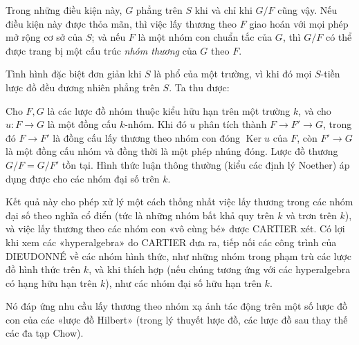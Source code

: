  Trong những điều kiện này, $G$ phẳng trên $S$ khi và chỉ
khi $G/F$ cũng vậy. Nếu điều kiện này được thỏa mãn, thì việc lấy thương
theo $F$ giao hoán với mọi phép mở rộng cơ sở của $S$; và nếu $F$ là một nhóm
con chuẩn tắc của $G$, thì $G/F$ có thể được trang bị một cấu trúc
\emph{nhóm thương} của $G$ theo $F$.

Tình hình đặc biệt đơn giản khi $S$ là phổ của một trường, vì khi đó mọi
$S$-tiền lược đồ đều đương nhiên phẳng trên $S$. Ta thu được:

 Cho $F,G$ là các lược đồ nhóm thuộc kiểu hữu hạn trên một
trường $k$, và cho $u:F\to G$ là một đồng cấu $k$-nhóm. Khi đó $u$ phân tích
thành $F\to F'\to G$, trong đó $F\to F'$ là đồng cấu lấy thương theo nhóm con
đóng $\operatorname{Ker}u$ của $F$, còn $F'\to G$ là một đồng cấu nhóm và đồng
thời là một phép nhúng đóng. Lược đồ thương $G/F=G/F'$ tồn tại. Hình thức luận
thông thường (kiểu các định lý Noether) áp dụng được cho các nhóm đại số trên
$k$.

Kết quả này cho phép xử lý một cách thống nhất việc lấy thương trong các nhóm
đại số theo nghĩa cổ điển (tức là những nhóm bất khả quy trên $k$ và trơn trên
$k$), và việc lấy thương theo các nhóm con «vô cùng bé»
được CARTIER xét. Có lợi khi xem các «hyperalgebra» do CARTIER đưa ra, tiếp nối
các công trình của DIEUDONNÉ về các nhóm hình thức, như những nhóm trong phạm
trù các lược đồ hình thức trên $k$, và khi thích hợp (nếu chúng tương ứng với
các hyperalgebra có hạng hữu hạn trên $k$), như các nhóm đại số hữu hạn trên
$k$.


Nó đáp ứng nhu cầu lấy thương theo nhóm xạ ảnh tác động trên một số lược đồ con
của các «lược đồ Hilbert» (trong lý thuyết lược đồ, các lược đồ sau thay thế
các đa tạp Chow).

